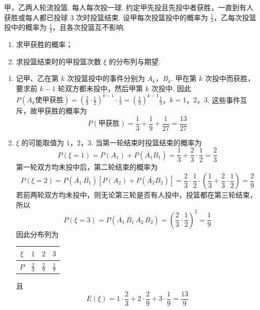 \begin{problem}
甲，乙两人轮流投篮. 每人每次投一球. 约定甲先投且先投中者获胜，一直到有人获胜或每人都已投球 3 次时投篮结束. 设甲每次投篮投中的概率为 \(\frac{1}{3}\)，乙每次投篮投中的概率为 \(\frac{1}{2}\)，且各次投篮互不影响.
\begin{enumerate}
\item 求甲获胜的概率；
\item 求投篮结束时的甲投篮次数 \( \xi \) 的分布列与期望.
\end{enumerate}
\begin{solution}
\begin{enumerate}
\item 记甲、乙在第 \(k\) 次投篮投中的事件分别为 \(A_{k}\)，\(B_{k}\). 甲在第 \(k\) 次投中而获胜，要求前 \(k-1\) 轮双方都未投中，然后甲第 \(k\) 次投中. 因此
\(P(A_{k}\text{使甲获胜}) =\left(\frac23\cdot\frac12\right)^{k-1}\cdot\frac13 =\left(\frac13\right)^{k-1}\frac13\)，\(k=1\)，\(2\)，\(3\).
这些事件互斥，故甲获胜的概率为
\[
P(\text{甲获胜})=\frac13+\frac19+\frac1{27}=\frac{13}{27}
\]

\item \(\xi\) 的可能取值为 \(1\)，\(2\)，\(3\). 当第一轮结束时投篮结束的概率为
\[
P(\xi=1)=P(A_{1})+P(\overline{A_{1}}B_{1})
=\frac13+\frac23\cdot\frac12=\frac23
\]
第一轮双方均未投中后，第二轮结束的概率为
\[
P(\xi=2)=P(\overline{A_{1}}\,\overline{B_{1}})
\left[P(A_{2})+P(\overline{A_{2}}B_{2})\right]
=\frac23\cdot\frac12\cdot\left(\frac13+\frac23\cdot\frac12\right)
=\frac29
\]
若前两轮双方均未投中，则无论第三轮是否有人投中，投篮都在第三轮结束，所以
\[
P(\xi=3)=P(\overline{A_{1}}\,\overline{B_{1}}\,\overline{A_{2}}\,\overline{B_{2}})
=\left(\frac23\cdot\frac12\right)^{2}=\frac19
\]
因此分布列为
\begin{center}
\begin{tabular}{c|ccc}
\(\xi\) & \(1\) & \(2\) & \(3\) \\
\hline
\(P\) & \(\frac23\) & \(\frac29\) & \(\frac19\)
\end{tabular}
\end{center}
且
\[
E(\xi)=1\cdot\frac23+2\cdot\frac29+3\cdot\frac19=\frac{13}{9}
\]
\end{enumerate}
\end{solution}
\end{problem}

